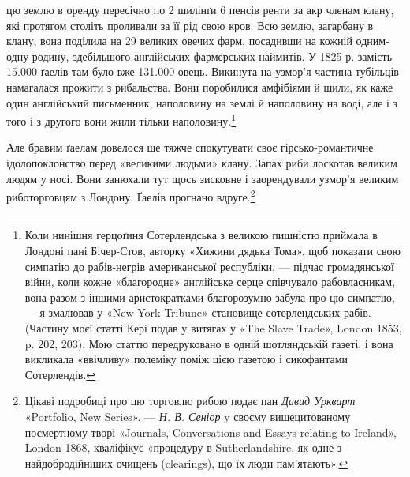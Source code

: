 цю землю в оренду пересічно по 2 шилінґи 6 пенсів ренти за акр
членам клану, які протягом століть проливали за її рід свою кров.
Всю землю, загарбану в клану, вона поділила на 29 великих
овечих фарм, посадивши на кожній одним-одну родину, здебільшого
англійських фармерських наймитів. У 1825 р. замість
\num{15.000} ґаелів там було вже \num{131.000} овець. Викинута на узмор’я
частина тубільців намагалася прожити з рибальства. Вони поробилися
амфібіями й шили, як каже один англійський письменник,
наполовину на землі й наполовину на воді, але і з того
і з другого вони жили тільки наполовину.\footnote{
Коли нинішня герцоґиня Сотерлендська з великою пишністю
приймала в Лондоні пані Бічер-Стов, авторку «Хижини дядька Тома»,
щоб показати свою симпатію до рабів-негрів американської республіки, —
підчас громадянської війни, коли кожне «благородне» англійське серце
співчувало рабовласникам, вона разом з іншими аристократками благорозумно
забула про цю симпатію, — я змалював у «New-York Tribune»
становище сотерлендських рабів. (Частину моєї статті Кері подав у витягах
у «The Slave Trade», London 1853, p. 202, 203). Мою статтю передруковано
в одній шотляндській газеті, і вона викликала «ввічливу» полеміку
поміж цією газетою і сикофантами Сотерлендів.
}

Але бравим ґаелам довелося ще тяжче спокутувати своє гірсько-романтичне
ідолопоклонство перед «великими людьми»
клану. Запах риби лоскотав великим людям у носі. Вони занюхали
тут щось зисковне і заорендували узмор’я великим риботорговцям
з Лондону. Ґаелів прогнано вдруге.\footnote{
Цікаві подробиці про цю торговлю рибою подає пан \emph{Давид Уркварт}
«Portfolio, New Series». — \emph{Н. В. Сеніор} y своєму вищецитованому посмертному
творі «Journals, Conversations and Essays relating to Ireland»,
London 1868, кваліфікує «процедуру в Sutherlandshire, як одне з найдобродійніших
очищень (clearings), що їх люди пам’ятають».
}

